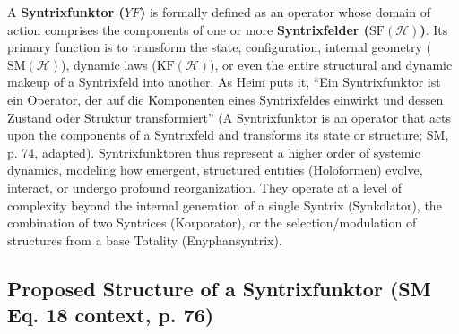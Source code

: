 \documentclass[
    12pt,              %
    a4paper,           %
    headings=normal,   %
    twoside=true,      %
    BCOR=8mm,          %
]{scrbook}
\newcommand{\q}[1]{\enquote{#1}}
\newcommand{\syntrixfunktor}{YF}
\begin{document}
A \textbf{Syntrixfunktor (\(\syntrixfunktor\))} is formally defined as an operator whose domain of action comprises the components of one or more \textbf{Syntrixfelder (\(\text{SF}(\mathcal{H})\))}. Its primary function is to transform the state, configuration, internal geometry (\(\text{SM}(\mathcal{H})\)), dynamic laws (\(\text{KF}(\mathcal{H})\)), or even the entire structural and dynamic makeup of a Syntrixfeld into another. As Heim puts it, \q{Ein Syntrixfunktor ist ein Operator, der auf die Komponenten eines Syntrixfeldes einwirkt und dessen Zustand oder Struktur transformiert} (A Syntrixfunktor is an operator that acts upon the components of a Syntrixfeld and transforms its state or structure; SM, p. 74, adapted). Syntrixfunktoren thus represent a higher order of systemic dynamics, modeling how emergent, structured entities (Holoformen) evolve, interact, or undergo profound reorganization. They operate at a level of complexity beyond the internal generation of a single Syntrix (Synkolator), the combination of two Syntrices (Korporator), or the selection/modulation of structures from a base Totality (Enyphansyntrix).

\subsection{Proposed Structure of a Syntrixfunktor (SM Eq. 18 context, p. 76)}
\label{sec:ch4_sf_structure_revised_2}
\end{document}
